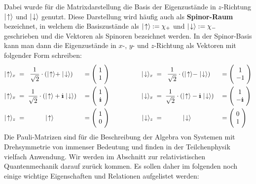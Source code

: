 Dabei wurde für die Matrixdarstellung die Basis der Eigenzustände in $z$-Richtung $\mid\!\!\!\,\,{\uparrow}\rangle$ und $\mid\!\!\!\,\,{\downarrow}\rangle$ genutzt. Diese Darstellung wird häufig auch als {\bf Spinor-Raum} bezeichnet, in welchem die Basiszustände als $\mid\!\!\!\,\,{\uparrow}\rangle:=\chi_+$ und $\mid\!\!\!\,\,{\downarrow}\rangle:=\chi_-$ geschrieben und die Vektoren als Spinoren bezeichnet werden. In der Spinor-Basis kann man dann die Eigenzustände in $x$-, $y$- und $z$-Richtung als Vektoren mit folgender Form schreiben: 
\begin{alignat*}{7}
	\up_x &\;=\;\; \frac{1}{\sqrt{2}}\cdot(\up+\down) &\;=\;& \Bigg(\!\begin{array}{c} 1 \\ 1 \end{array}\!\Bigg) \qquad\qquad &\down_x &\;=\;\; \frac{1}{\sqrt{2}}\cdot(\up-\down) &\;=\;& \Bigg(\!\begin{array}{c} 1 \\ -1 \end{array}\!\Bigg)
	\\
	\up_x &\;=\; \frac{1}{\sqrt{2}}\cdot(\up+\I\down) &\;=\;& \Bigg(\!\begin{array}{c} 1 \\ \I \end{array}\!\Bigg) \qquad\qquad &\down_x &\;=\; \frac{1}{\sqrt{2}}\cdot(\up-\I\down) &\;=\;& \Bigg(\!\begin{array}{c} 1 \\ -\I \end{array}\!\Bigg)
	\\	
	\up_z &\;=\; \qquad\quad\up &\;=\;& \Bigg(\!\begin{array}{c} 1 \\ 0 \end{array}\!\Bigg) \qquad\qquad &\down_z &\;=\; \qquad\quad\down &\;=\;& \Bigg(\!\begin{array}{c} 0 \\ 1 \end{array}\!\Bigg)
\end{alignat*}
Die Pauli-Matrizen sind für die Beschreibung der Algebra von Systemen mit Drehsymmetrie von immenser Bedeutung und finden in der Teilchenphysik vielfach Anwendung. Wir werden im Abschnitt zur relativistischen Quantenmechanik darauf zurück kommen. Es sollen daher im folgenden noch einige wichtige Eigenschaften und Relationen aufgelistet werden: 
